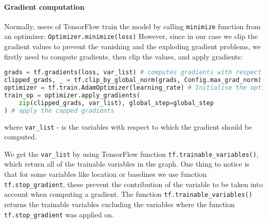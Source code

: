 \paragraph{Gradient computation} Normally, users of TensorFlow train the model
by calling \lstinline{minimize} function from an optimizer: \lstinline{Optimizer.minimize(loss)}
However, since in our case we clip the gradient values
to prevent the vanishing and the exploding gradient problems, we firstly
need to compute gradients, then clip the values, and apply gradients:

\begin{lstlisting}[language=Python, caption={gradient computation},label={list:comp_grad}]
grads = tf.gradients(loss, var_list) # computes gradients with respect to var_list
clipped_grads, _ = tf.clip_by_global_norm(grads, Config.max_grad_norm) # clip the values
optimizer = tf.train.AdamOptimizer(learning_rate) # Initialise the optimizer
train_op = optimizer.apply_gradients(
	zip(clipped_grads, var_list), global_step=global_step
) # apply the capped gradients
\end{lstlisting}
where \lstinline{var_list} - is the variables with respect to which the gradient should
be computed.

We get the \lstinline{var_list} by using TensorFlow function \lstinline{tf.trainable_variables()},
which return all of the trainable variables in the graph. One thing to notice is
that for some variables like location or baselines we use function \lstinline{tf.stop_gradient},
these prevent the contribution of the variable to be taken into account when computing a
gradient. The function \lstinline{tf.trainable_variables()} returns the trainable variables excluding
the variables where the function \lstinline{tf.stop_gradient} was applied on.
